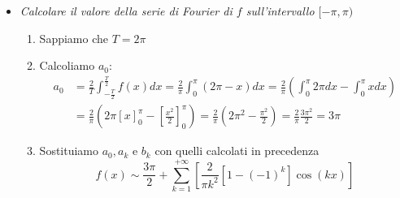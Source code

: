\documentclass[10pt, a4paper]{article}
\begin{document}
\begin{itemize}
\begin{enumerate}
\begin{equation*}
            \end{equation*}
        \end{enumerate}
        \item \textit{Calcolare il valore della serie di Fourier di $f$ sull'intervallo $[-\pi,\pi)$} \begin{enumerate}
            \item Sappiamo che $T=2\pi$
            \item Calcoliamo $a_0$: \begin{equation*}
                \begin{split}
                    a_0 &= \frac{2}{T}\int_{-\frac{T}{2}}^{\frac{T}{2}}f(x)dx=\frac{2}{\pi}\int_{0}^{\pi}(2\pi-x)dx=\frac{2}{\pi}\left(\int_{0}^{\pi}2\pi dx-\int_{0}^{\pi}x dx\right)\\
                    &=\frac{2}{\pi}\left(2\pi\left[x\right]_{0}^{\pi}-\left[\frac{x^2}{2}\right]_{0}^{\pi}\right)=\frac{2}{\pi}\left(2\pi^2-\frac{\pi^2}{2}\right)=\frac{2}{\pi}\frac{3\pi^2}{2}=3\pi
                \end{split}
            \end{equation*}
            \item Sostituiamo $a_0, a_k \text{ e } b_k$ con quelli calcolati in precedenza \begin{equation*}
                f(x) \sim \frac{3\pi}{2}+\sum_{k=1}^{+\infty}\left[\frac{2}{\pi k^2}[1-(-1)^k]\cos\left(kx\right)\right]                
            \end{equation*}
        \end{enumerate}
    \end{itemize}
\end{document}

